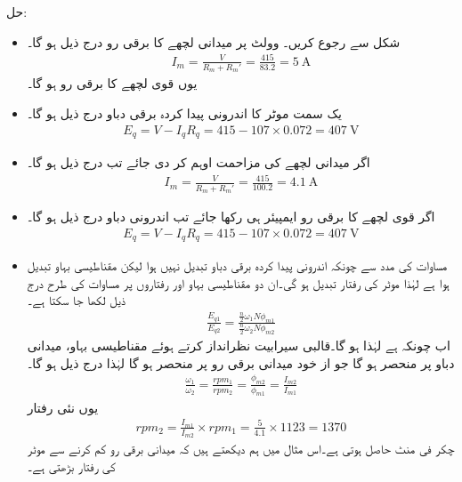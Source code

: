 حل:
\begin{itemize}
\item
شکل   سے رجوع کریں۔ وولٹ پر میدانی لچھے کا برقی رو درج ذیل ہو گا۔
\begin{align*}
I_m=\tfrac{V}{R_m+R_m'}=\frac{415}{83.2}= \SI{5}{\ampere}
\end{align*}
یوں قوی لچھے کا برقی رو  ہو گا۔
\item
یک سمت  موٹر کا اندرونی پیدا کردہ برقی دباو درج ذیل ہو گا۔
\begin{align*}
E_q=V-I_q R_q=415-107\times 0.072=\SI{407}{\volt}
\end{align*}
\item
اگر میدانی لچھے کی مزاحمت  اوہم کر دی جائے  تب  درج ذیل ہو گا۔
\begin{align*}
I_m=\frac{V}{R_m+R_m'}=\frac{415}{100.2}= \SI{4.1}{\ampere}
\end{align*}
\item
اگر قوی لچھے کا برقی رو  ایمپیئر ہی رکھا جائے تب  اندرونی دباو درج ذیل ہو گا۔
\begin{align*}
E_q=V-I_q R_q=415-107 \times 0.072= \SI{407}{\volt}
\end{align*}
\item
مساوات   کی مدد سے  چونکہ اندرونی پیدا کردہ برقی دباو تبدیل نہیں ہوا لیکن مقناطیسی بہاو تبدیل ہوا ہے لہٰذا موٹر کی رفتار تبدیل ہو گی۔ان دو مقناطیسی بہاو اور رفتاروں پر مساوات  کی طرح  درج ذیل لکھا جا سکتا ہے۔
\begin{align*}
\frac{E_{q1}}{E_{q2}}=\frac{\frac{n}{2} \omega_1 N \phi_{m1}}{\frac{n}{2} \omega_2 N \phi_{m2}}
\end{align*}
اب چونکہ  ہے  لہٰذا  ہو گا۔قالبی سیرابیت  نظرانداز کرتے ہوئے مقناطیسی بہاو، میدانی دباو پر منحصر ہو گا جو از خود میدانی برقی رو پر منحصر ہو گا  لہٰذا درج ذیل ہو گا۔
\begin{align*}
\frac{\omega_1}{\omega_2}=\frac{rpm_1}{rpm_2}=\frac{\phi_{m2}}{\phi_{m1}}=\frac{I_{m2}}{I_{m1}}
\end{align*}
یوں  نئی رفتار
\begin{align*}
rpm_2=\frac{I_{m1}}{I_{m2}} \times rpm_1=\frac{5}{4.1} \times 1123= 1370
\end{align*}
چکر فی منٹ حاصل ہوتی ہے۔اس مثال میں ہم دیکھتے ہیں کہ میدانی برقی رو کم کرنے سے موٹر کی رفتار بڑھتی ہے۔
\end{itemize}
